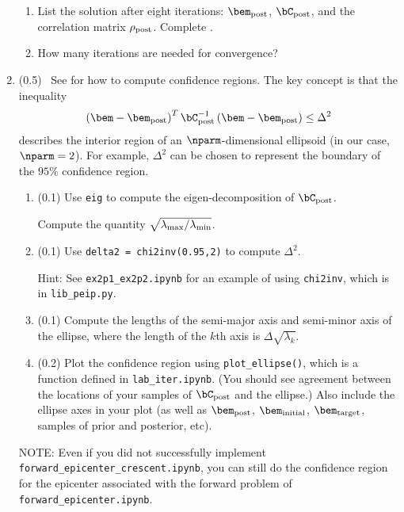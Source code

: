 \documentclass[11pt,titlepage,fleqn]{article}
\newcommand{\tfile}{{\tt lab\_iter.ipynb}}
\newcommand{\tfileFE}{{\tt forward\_epicenter.ipynb}}
\newcommand{\tfileFEC}{{\tt forward\_epicenter\_crescent.ipynb}}
\begin{document}
\begin{enumerate}
\begin{enumerate}
\item List the solution after eight iterations: $\bem_{\rm post}$, $\bC_{\rm post}$, and the correlation matrix $\rho_{\rm post}$. Complete . 

\item How many iterations are needed for convergence?
\end{enumerate}


\pagebreak
\item (0.5) \ptag\ See \citet[][p.~34--36]{Aster} for how to compute confidence regions. The key concept is that the inequality
%
\begin{equation*}
\left(\bem - \bem_{\rm post} \right)^T \bC_{\rm post}^{-1} \left(\bem - \bem_{\rm post} \right) \le \Delta^2
\end{equation*}
%
describes the interior region of an $\nparm$-dimensional ellipsoid (in our case, $\nparm=2$). For example, $\Delta^2$ can be chosen to represent the boundary of the $95\%$ confidence region.
%
\begin{enumerate}
\item (0.1) Use \verb+eig+ to compute the eigen-decomposition of $\bC_{\rm post}$.

Compute the quantity $\sqrt{\lambda_{\rm max}/\lambda_{\rm min}}$.

\item (0.1) Use \verb+delta2 = chi2inv(0.95,2)+ to compute $\Delta^2$.

Hint: See \verb+ex2p1_ex2p2.ipynb+ for an example of using \verb+chi2inv+, which is in \verb+lib_peip.py+.

\item (0.1) Compute the lengths of the semi-major axis and semi-minor axis of the ellipse, where the length of the $k$th axis is $\Delta\sqrt{\lambda_k}$.

\item (0.2) Plot the confidence region using \verb+plot_ellipse()+, which is a function defined in \tfile. (You should see agreement between the locations of your samples of $\bC_{\rm post}$ and the ellipse.) Also include the ellipse axes in your plot (as well as $\bem_{\rm post}$, $\bem_{\rm initial}$, $\bem_{\rm target}$, samples of prior and posterior, etc).
\end{enumerate}

NOTE: Even if you did not successfully implement \tfileFEC, you can still do the confidence region for the epicenter associated with the forward problem of \tfileFE.

\end{enumerate}
\end{document}

